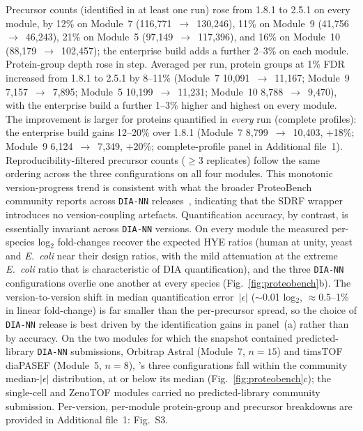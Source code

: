 Precursor counts (identified in at least one run) rose from 1.8.1 to 2.5.1 on every module, by 12\% on Module~7 (116{,}771~$\to$~130{,}246), 11\% on Module~9 (41{,}756~$\to$~46{,}243), 21\% on Module~5 (97{,}149~$\to$~117{,}396), and 16\% on Module~10 (88{,}179~$\to$~102{,}457); the enterprise build adds a further 2--3\% on each module.
Protein-group depth rose in step. Averaged per run, protein groups at 1\% FDR increased from 1.8.1 to 2.5.1 by 8--11\% (Module~7 10{,}091~$\to$~11{,}167; Module~9 7{,}157~$\to$~7{,}895; Module~5 10{,}199~$\to$~11{,}231; Module~10 8{,}788~$\to$~9{,}470), with the enterprise build a further 1--3\% higher and highest on every module. The improvement is larger for proteins quantified in \emph{every} run (complete profiles): the enterprise build gains 12--20\% over 1.8.1 (Module~7 8{,}799~$\to$~10{,}403, $+$18\%; Module~9 6{,}124~$\to$~7{,}349, $+$20\%; complete-profile panel in Additional file~1).
Reproducibility-filtered precursor counts ($\geq$3 replicates) follow the same ordering across the three configurations on all four modules.
This monotonic version-progress trend is consistent with what the broader ProteoBench community reports across \texttt{DIA-NN} releases~\cite{devreese2025proteobench}, indicating that the SDRF wrapper introduces no version-coupling artefacts.
Quantification accuracy, by contrast, is essentially invariant across \texttt{DIA-NN} versions.
On every module the measured per-species log$_2$ fold-changes recover the expected HYE ratios (human at unity, yeast and \emph{E.\ coli} near their design ratios, with the mild attenuation at the extreme \emph{E.\ coli} ratio that is characteristic of DIA quantification), and the three \texttt{DIA-NN} configurations overlie one another at every species (Fig.~\ref{fig:proteobench}b).
The version-to-version shift in median quantification error~$|\epsilon|$ ($\sim$0.01 log$_2$, $\approx$0.5--1\% in linear fold-change) is far smaller than the per-precursor spread, so the choice of \texttt{DIA-NN} release is best driven by the identification gains in panel~(a) rather than by accuracy.
On the two modules for which the snapshot contained predicted-library \texttt{DIA-NN} submissions, Orbitrap Astral (Module~7, $n=15$) and timsTOF diaPASEF (Module~5, $n=8$), \quantmsdiann{}'s three configurations fall within the community median-$|\epsilon|$ distribution, at or below its median (Fig.~\ref{fig:proteobench}c); the single-cell and ZenoTOF modules carried no predicted-library community submission. Per-version, per-module protein-group and precursor breakdowns are provided in Additional file~1: Fig.~S3.

